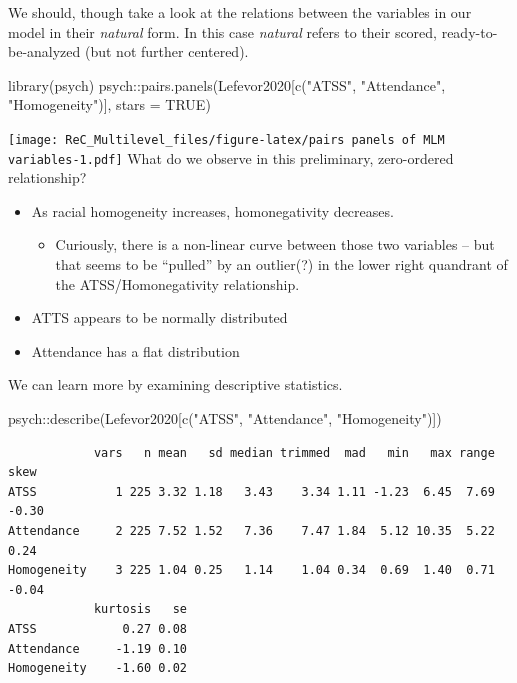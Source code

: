 \documentclass[
  english,
]{book}
\newenvironment{Shaded}{\begin{snugshade}}{\end{snugshade}}
\newcommand{\AttributeTok}[1]{\textcolor[rgb]{0.77,0.63,0.00}{#1}}
\newcommand{\ConstantTok}[1]{\textcolor[rgb]{0.00,0.00,0.00}{#1}}
\newcommand{\FunctionTok}[1]{\textcolor[rgb]{0.00,0.00,0.00}{#1}}
\newcommand{\NormalTok}[1]{#1}
\newcommand{\SpecialCharTok}[1]{\textcolor[rgb]{0.00,0.00,0.00}{#1}}
\newcommand{\StringTok}[1]{\textcolor[rgb]{0.31,0.60,0.02}{#1}}
\providecommand{\tightlist}{%
  \setlength{\itemsep}{0pt}\setlength{\parskip}{0pt}}
\begin{document}
We should, though take a look at the relations between the variables in our model in their \emph{natural} form. In this case \emph{natural} refers to their scored, ready-to-be-analyzed (but not further centered).

\begin{Shaded}
\begin{Highlighting}[]
\FunctionTok{library}\NormalTok{(psych)}
\NormalTok{psych}\SpecialCharTok{::}\FunctionTok{pairs.panels}\NormalTok{(Lefevor2020[}\FunctionTok{c}\NormalTok{(}\StringTok{"ATSS"}\NormalTok{, }\StringTok{"Attendance"}\NormalTok{, }\StringTok{"Homogeneity"}\NormalTok{)], }\AttributeTok{stars =} \ConstantTok{TRUE}\NormalTok{)}
\end{Highlighting}
\end{Shaded}

\texttt{[image: ReC\_Multilevel\_files/figure-latex/pairs panels of MLM variables-1.pdf]}
What do we observe in this preliminary, zero-ordered relationship?

\begin{itemize}
\tightlist
\item
  As racial homogeneity increases, homonegativity decreases.

  \begin{itemize}
  \tightlist
  \item
    Curiously, there is a non-linear curve between those two variables -- but that seems to be ``pulled'' by an outlier(?) in the lower right quandrant of the ATSS/Homonegativity relationship.
  \end{itemize}
\item
  ATTS appears to be normally distributed
\item
  Attendance has a flat distribution
\end{itemize}

We can learn more by examining descriptive statistics.

\begin{Shaded}
\begin{Highlighting}[]
\NormalTok{psych}\SpecialCharTok{::}\FunctionTok{describe}\NormalTok{(Lefevor2020[}\FunctionTok{c}\NormalTok{(}\StringTok{"ATSS"}\NormalTok{, }\StringTok{"Attendance"}\NormalTok{, }\StringTok{"Homogeneity"}\NormalTok{)])}
\end{Highlighting}
\end{Shaded}

\begin{verbatim}
            vars   n mean   sd median trimmed  mad   min   max range  skew
ATSS           1 225 3.32 1.18   3.43    3.34 1.11 -1.23  6.45  7.69 -0.30
Attendance     2 225 7.52 1.52   7.36    7.47 1.84  5.12 10.35  5.22  0.24
Homogeneity    3 225 1.04 0.25   1.14    1.04 0.34  0.69  1.40  0.71 -0.04
            kurtosis   se
ATSS            0.27 0.08
Attendance     -1.19 0.10
Homogeneity    -1.60 0.02
\end{verbatim}
\end{document}

